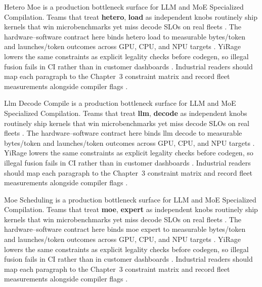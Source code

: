 Hetero Moe is a production bottleneck surface for LLM and MoE Specialized Compilation. Teams that treat \textbf{hetero}, \textbf{load} as independent knobs routinely ship kernels that win microbenchmarks yet miss decode SLOs on real fleets \citep{liu2024deepseekv3,memoryfloor2026}. The hardware--software contract here binds hetero load to measurable bytes/token and launches/token outcomes across GPU, CPU, and NPU targets \citep{patel2025llminference,nvidia2022hopper}. YiRage lowers the same constraints as explicit legality checks before codegen, so illegal fusion fails in CI rather than in customer dashboards \citep{taxbreak2026,semianalysis2024tma}. Industrial readers should map each paragraph to the Chapter~3 constraint matrix and record fleet measurements alongside compiler flags \citep{memoryfloor2026,amd2024xdna}.

Llm Decode Compile is a production bottleneck surface for LLM and MoE Specialized Compilation. Teams that treat \textbf{llm}, \textbf{decode} as independent knobs routinely ship kernels that win microbenchmarks yet miss decode SLOs on real fleets \citep{patel2025llminference,nvidia2022hopper}. The hardware--software contract here binds llm decode to measurable bytes/token and launches/token outcomes across GPU, CPU, and NPU targets \citep{taxbreak2026,semianalysis2024tma}. YiRage lowers the same constraints as explicit legality checks before codegen, so illegal fusion fails in CI rather than in customer dashboards \citep{memoryfloor2026,amd2024xdna}. Industrial readers should map each paragraph to the Chapter~3 constraint matrix and record fleet measurements alongside compiler flags \citep{nvidia2022hopper,amd2024aie}.

Moe Scheduling is a production bottleneck surface for LLM and MoE Specialized Compilation. Teams that treat \textbf{moe}, \textbf{expert} as independent knobs routinely ship kernels that win microbenchmarks yet miss decode SLOs on real fleets \citep{taxbreak2026,semianalysis2024tma}. The hardware--software contract here binds moe expert to measurable bytes/token and launches/token outcomes across GPU, CPU, and NPU targets \citep{memoryfloor2026,amd2024xdna}. YiRage lowers the same constraints as explicit legality checks before codegen, so illegal fusion fails in CI rather than in customer dashboards \citep{nvidia2022hopper,amd2024aie}. Industrial readers should map each paragraph to the Chapter~3 constraint matrix and record fleet measurements alongside compiler flags \citep{semianalysis2024tma,dlbook}.

